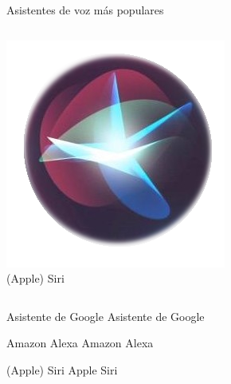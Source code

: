 \documentclass{beamer}
\begin{document}
\begin{frame}[c]{Asistentes de voz más populares}
    \vspace{2em}

    \begin{columns}
      \begin{column}{\textwidth}
        \centering
        \hyperlink{apple-siri}{\includegraphics[scale=.4]{apple-siri-logo.png}}\\
        (Apple) Siri
      \end{column}
    \end{columns}
  \end{frame}

  \begin{frame}[label=asistente-google]{ Asistente de Google}
    Asistente de Google
  \end{frame}

  \begin{frame}[label=amazon-alexa]{ Amazon Alexa}
    Amazon Alexa
  \end{frame}

  \begin{frame}[label=apple-siri]{ (Apple) Siri}
    Apple Siri
  \end{frame}
\end{document}
